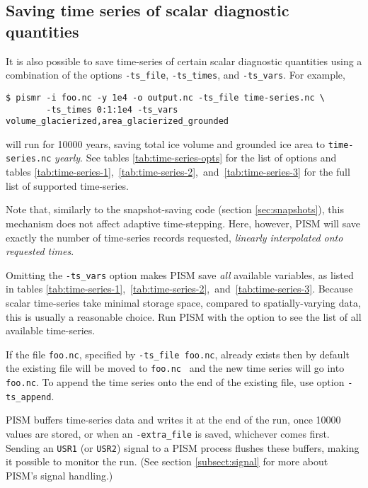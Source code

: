 \subsection{Saving time series of scalar diagnostic quantities}
\label{sec:saving-time-series}

\newcommand{\alltsvars}{\ref{tab:time-series-1},~\ref{tab:time-series-2},~and~\ref{tab:time-series-3}}

 It is also possible to save time-series of certain scalar diagnostic quantities using a combination of the options \texttt{-ts_file}, \texttt{-ts_times}, and \texttt{-ts_vars}.  For example,
\begin{verbatim}
$ pismr -i foo.nc -y 1e4 -o output.nc -ts_file time-series.nc \
        -ts_times 0:1:1e4 -ts_vars volume_glacierized,area_glacierized_grounded
\end{verbatim}
will run for 10000 years, saving total ice volume and grounded ice area to \texttt{time-series.nc} \emph{yearly}. See tables \ref{tab:time-series-opts} for the list of options and tables \alltsvars{} for the full list of supported time-series.

Note that, similarly to the snapshot-saving code (section \ref{sec:snapshots}), this mechanism does not affect adaptive time-stepping.  Here, however, PISM will save exactly the number of time-series records requested, \emph{linearly interpolated onto requested times}.

Omitting the \texttt{-ts_vars} option makes PISM save \emph{all} available
variables, as listed in tables \alltsvars{}.  Because scalar
time-series take minimal storage space, compared to spatially-varying data,
this is usually a reasonable choice. Run PISM with the
 option to see the list of all available time-series.

If the file \texttt{foo.nc}, specified by \texttt{-ts_file foo.nc}, already exists then by default the existing file will be moved to \texttt{foo.nc~} and the new time series will go into \texttt{foo.nc}.  To append the time series onto the end of the existing file, use option \texttt{-ts_append}.

PISM buffers time-series data and writes it at the end of the run, once 10000
values are stored, or when an \texttt{-extra_file} is saved, whichever comes first. Sending an \texttt{USR1} (or
\texttt{USR2}) signal to a PISM process flushes these buffers, making it
possible to monitor the run. (See section \ref{subsect:signal} for more about
PISM's signal handling.)

